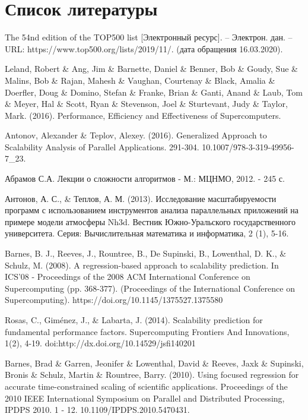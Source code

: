 \section{Список литературы}
	\begingroup
		\renewcommand{\section}[2]{}%
		\begin{thebibliography}{}
			The 54nd edition of the TOP500 list [Электронный ресурс]. – Электрон. дан. – URL: https://www.top500.org/lists/2019/11/. (дата обращения 16.03.2020).

			Leland, Robert \& Ang, Jim \& Barnette, Daniel \& Benner, Bob \& Goudy, Sue \& Malins, Bob \& Rajan, Mahesh \& Vaughan, Courtenay \& Black, Amalia \& Doerfler, Doug \& Domino, Stefan \& Franke, Brian \& Ganti, Anand \& Laub, Tom \& Meyer, Hal \& Scott, Ryan \& Stevenson, Joel \& Sturtevant, Judy \& Taylor, Mark. (2016). Performance, Efficiency and Effectiveness of Supercomputers.

			Antonov, Alexander \& Teplov, Alexey. (2016). Generalized Approach to Scalability Analysis of Parallel Applications. 291-304. 10.1007/978-3-319-49956-7\_23. 

			Абрамов С.А. Лекции о сложности алгоритмов - М.: МЦНМО, 2012. - 245 с.

			Антонов, А. С., \& Теплов, А. М. (2013). Исследование масштабируемости программ с использованием инструментов анализа параллельных приложений на примере модели атмосферы Nh3d. Вестник Южно-Уральского государственного университета. Серия: Вычислительная математика и информатика, 2 (1), 5-16.

			Barnes, B. J., Reeves, J., Rountree, B., De Supinski, B., Lowenthal, D. K., \& Schulz, M. (2008). A regression-based approach to scalability prediction. In ICS'08 - Proceedings of the 2008 ACM International Conference on Supercomputing (pp. 368-377). (Proceedings of the International Conference on Supercomputing). https://doi.org/10.1145/1375527.1375580
		
			Rosas, C., Giménez, J., \& Labarta, J. (2014). Scalability prediction for fundamental performance factors. Supercomputing Frontiers And Innovations, 1(2), 4-19. doi:http://dx.doi.org/10.14529/jsfi140201

			Barnes, Brad \& Garren, Jeonifer \& Lowenthal, David \& Reeves, Jaxk \& Supinski, Bronis \& Schulz, Martin \& Rountree, Barry. (2010). Using focused regression for accurate time-constrained scaling of scientific applications. Proceedings of the 2010 IEEE International Symposium on Parallel and Distributed Processing, IPDPS 2010. 1 - 12. 10.1109/IPDPS.2010.5470431. 


\end{thebibliography}
